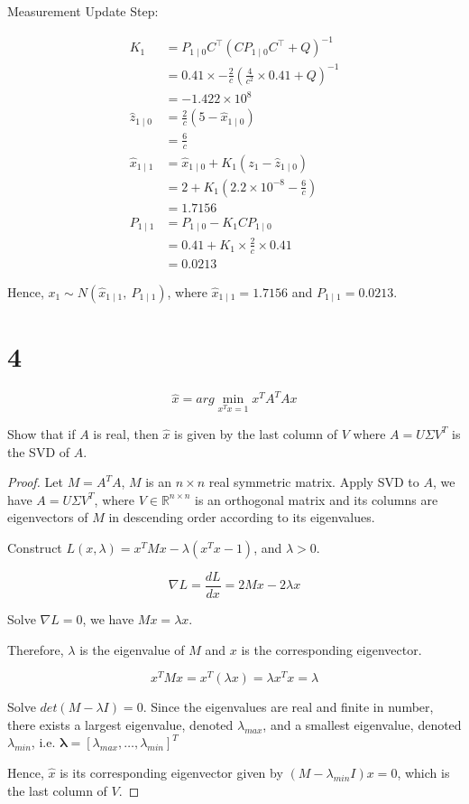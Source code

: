 \documentclass{article}
\theoremstyle{definition} %
\newcommand{\RR}{\mathbb{R}}
\begin{document}
Measurement Update Step:

\begin{align*}
    K_1 &=P_{1\mid 0} C^{\top}\left(C P_{1\mid 0} C^{\top}+Q\right)^{-1} \\
    &=0.41 \times-\frac{2}{c}\left(\frac{4}{c^2} \times 0.41+Q\right)^{-1} \\
    &=-1.422\times 10^8 \\
    \hat{z}_{1\mid 0} &=\frac{2}{c}\left(5-\hat{x}_{1\mid 0}\right) \\
    &=\frac{6}{c} \\
    \hat{x}_{1\mid 1} &=\hat{x}_{1\mid 0}+K_1\left(z_1-\hat{z}_{1\mid 0}\right) \\
    &=2+K_1\left(2.2 \times 10^{-8}-\frac{6}{c}\right) \\
    &=1.7156 \\
    P_{1 \mid 1} &=P_{1\mid 0}-K_1 C P_{1\mid 0} \\
    &=0.41+K_1 \times \frac{2}{c} \times 0.41 \\
    &=0.0213
\end{align*}

Hence, $x_1 \sim N(\hat{x}_{1\mid 1},\ P_{1\mid 1})$, where $\hat{x}_{1\mid 1} = 1.7156$ and $P_{1\mid 1} = 0.0213$.

\section*{4}

$$
\hat{x} = arg \min_{x^Tx = 1} x^TA^TAx
$$

Show that if $A$ is real, then $\hat{x}$ is given by the last column of $V$ where $A = U\Sigma V^T$ is the SVD of $A$.
\begin{proof}
    
Let $M=A^TA$, $M$ is an $n\times n$ real symmetric matrix. Apply SVD to $A$, we have $A = U\Sigma V^T$, where $V\in \RR^{n\times n}$ is an orthogonal matrix and its columns are eigenvectors of $M$ in descending order according to its eigenvalues.

Construct $L(x, \lambda) = x^TMx -\lambda (x^Tx-1)$, and $\lambda > 0$.

$$\nabla L = \frac{dL}{dx} = 2Mx - 2\lambda x$$

Solve $\nabla L = 0$, we have $Mx = \lambda x$.

Therefore, $\lambda$ is the eigenvalue of $M$ and $x$ is the corresponding eigenvector.

$$
x^TMx = x^T(\lambda x) = \lambda x^T x = \lambda
$$

Solve $det(M-\lambda I)=0$. Since the eigenvalues are real and finite in number, there exists a largest eigenvalue, denoted $\lambda_{max}$,
and a smallest eigenvalue, denoted  $\lambda_{min}$, i.e. $\boldsymbol \lambda = [\lambda_{max}, \dots, \lambda_{min}]^T$

Hence, $\hat{x}$ is its corresponding eigenvector given by $(M - \lambda_{min}I)x=0$, which is the last column of $V$.

\end{proof}




\end{document}
